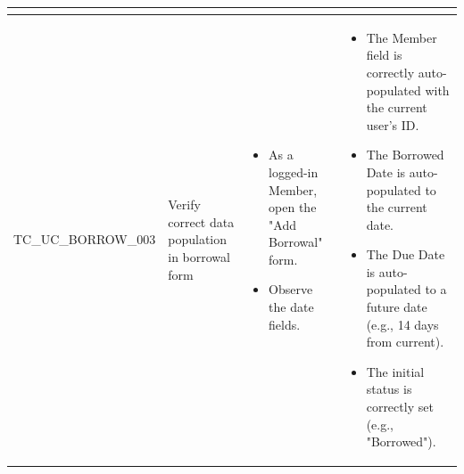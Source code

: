\begin{longtable}{|>{\scriptsize\raggedright\arraybackslash}p{3.5cm}|>{\raggedright\arraybackslash}p{3.5cm}|>{\raggedright\arraybackslash}p{4cm}|>{\raggedright\arraybackslash}p{4cm}|}
\begin{itemize}[noitemsep, topsep=0pt, partopsep=0pt, leftmargin=*]
    \end{itemize} \\ \hline
TC\_UC\_BORROW\_003 & Verify correct data population in borrowal form & 
    \begin{itemize}[noitemsep, topsep=0pt, partopsep=0pt, leftmargin=*]
        \item As a logged-in Member, open the "Add Borrowal" form.
        \item Observe the date fields.
    \end{itemize} & 
    \begin{itemize}[noitemsep, topsep=0pt, partopsep=0pt, leftmargin=*]
        \item The Member field is correctly auto-populated with the current user's ID.
        \item The Borrowed Date is auto-populated to the current date.
        \item The Due Date is auto-populated to a future date (e.g., 14 days from current).
        \item The initial status is correctly set (e.g., "Borrowed").
    \end{itemize} \\ \hline


\end{longtable}
